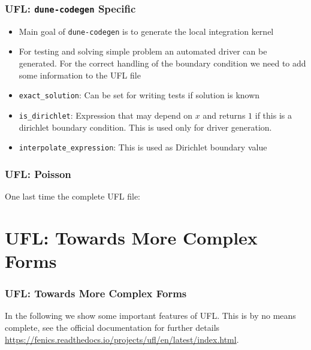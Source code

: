 \documentclass[aspectratio=169,11pt]{beamer}
\theoremstyle{definition}
\begin{document}
\begin{frame}
  \frametitle{UFL: \lstinline{dune-codegen} Specific}
  
  \vfill
  \begin{itemize}
  \item Main goal of \lstinline{dune-codegen} is to generate the local integration kernel
  \item For testing and solving simple problem an automated driver can be
    generated. For the correct handling of the boundary condition we need to
    add some information to the UFL file
  \item \lstinline{exact_solution}: Can be set for writing tests if solution is known
  \item \lstinline{is_dirichlet}: Expression that may depend on $x$ and returns
    $1$ if this is a dirichlet boundary condition. This is used only for driver
    generation.
  \item \lstinline{interpolate_expression}: This is used as Dirichlet boundary value
  \end{itemize}
\end{frame}

\begin{frame}
  \frametitle{UFL: Poisson}

  One last time the complete UFL file:

  
\end{frame}



\section{UFL: Towards More Complex Forms}


\begin{frame}
  \frametitle{UFL: Towards More Complex Forms}
  In the following we show some important features of UFL. This is by no means
  complete, see the official documentation for further details
  \url{https://fenics.readthedocs.io/projects/ufl/en/latest/index.html}.
\end{frame}
\end{document}
